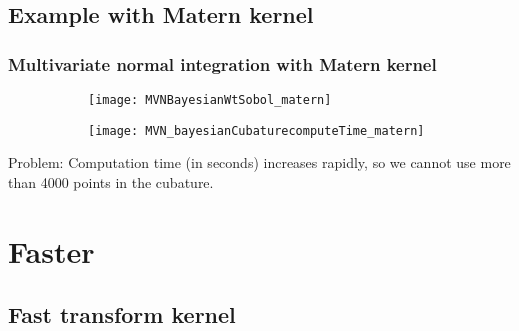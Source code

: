 \documentclass[10pt,compress,xcolor={usenames,dvipsnames}]{beamer} %
\begin{document}
\subsection{Example with Matern  kernel}
\begin{frame}
\frametitle{Multivariate normal integration with Matern kernel}
\begin{figure}[htp]
\captionsetup[subfigure]{labelformat=empty}
\centering
\begin{subfigure}[b]{0.49\textwidth}
\texttt{[image: MVNBayesianWtSobol\_matern]}
\end{subfigure}
\centering
\begin{subfigure}[b]{0.49\textwidth}
\texttt{[image: MVN\_bayesianCubaturecomputeTime\_matern]}
\end{subfigure}
\label{fig:MVN_Metern_d2b2}
\end{figure}
\alert{Problem}: Computation time (in seconds) increases rapidly, so we cannot use more than 4000 points in the cubature.
\end{frame}
















\section{Faster}



\subsection{Fast transform kernel}
\end{document}
